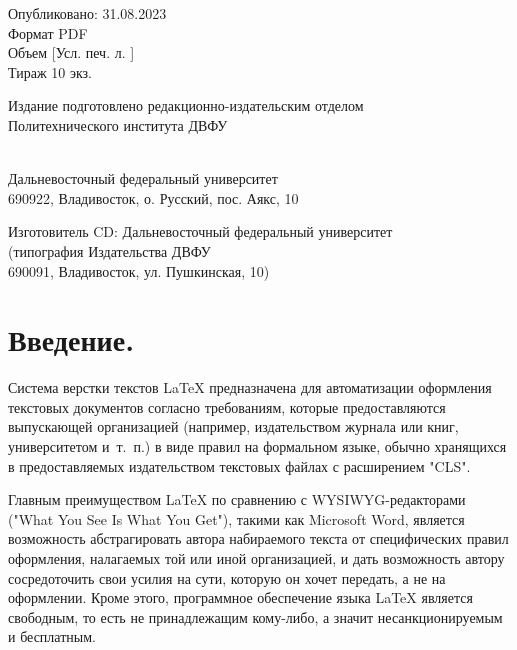 \documentclass[workbook]{fefudoc}
\begin{document}
\begin{copyrightpage}
\begin{publisherblock}
		\begin{publisherinfo}
			Опубликовано: 31.08.2023 \\
			Формат PDF \\
			Объем \totalpdfsize{} [Усл. печ. л. \totalprintlists*] \\
			Тираж 10 экз.
		\end{publisherinfo}

		\begin{publisherinfo}
			Издание подготовлено редакционно-издательским отделом \\
			Политехнического института ДВФУ \\
			[Кампус ДВФУ, корп. С, каб. 714]\\
		\end{publisherinfo}

		\begin{publisherinfo}
			Дальневосточный федеральный университет \\
			690922, Владивосток, о. Русский, пос. Аякс, 10
		\end{publisherinfo}

		\begin{publisherinfo}
			Изготовитель CD: Дальневосточный федеральный университет \\
			(типография Издательства ДВФУ \\
			690091, Владивосток, ул. Пушкинская, 10)
		\end{publisherinfo}
	\end{publisherblock}
\end{copyrightpage}
\tableofcontents

\chapter*{Введение.}
Система верстки текстов \LaTeX{} \cite{Lamport96} предназначена для автоматизации оформления текстовых документов согласно требованиям, которые предоставляются выпускающей организацией (например, издательством журнала или книг, университетом и~т.~п.) в виде правил на формальном языке, обычно хранящихся в предоставляемых издательством текстовых файлах с расширением "CLS".

Главным преимуществом \LaTeX{} по сравнению с WYSIWYG-редакторами ("What You See Is What You Get"), такими как Microsoft Word, является возможность абстрагировать автора набираемого текста от специфических правил оформления, налагаемых той или иной организацией, и дать возможность автору сосредоточить свои усилия на сути, которую он хочет передать, а не на оформлении.
Кроме этого, программное обеспечение языка \LaTeX{} является свободным, то есть не принадлежащим кому-либо, а значит несанкционируемым и бесплатным.
\end{document}
